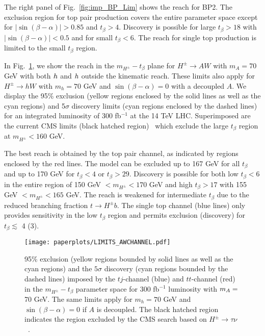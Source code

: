 The right panel of Fig.~\ref{fig:imp_BP_Lim} shows the reach for BP2. The exclusion region for top pair production covers the entire parameter space except for $|\sin(\beta-\alpha)| >0.85$ and $t_{\beta}> 4$. Discovery is possible for large $t_{\beta}>18$ with $|\sin(\beta-\alpha)|<0.5$ and for small $t_{\beta}<6$. The reach for single top production is limited to the small $t_{\beta}$ region.

In Fig.~\ref{fig:imp_Limits}, we show the reach in the $m_{H^{\pm}}-t_{\beta}$ plane for $H^{\pm} \rightarrow AW$ with $m_A=70$ GeV with both $h$ and $h$ outside the kinematic reach. These limits also apply for $H^{\pm} \rightarrow hW$ with $m_{h}=70$ GeV and $\sin(\beta-\alpha)=0$ with a decoupled $A$. We display the 95\% exclusion (yellow regions enclosed by the solid lines as well as the cyan regions) and 5$\sigma$ discovery limits (cyan regions enclosed by the dashed lines) for an integrated luminosity of 300 fb$^{-1}$ at the 14 TeV LHC. Superimposed are the current CMS limits (black hatched region)~\cite{CMS:2014cdp} which exclude the large $t_{\beta}$ region at $m_{H^\pm}<160$ GeV. 

The best reach is obtained by the top pair channel, as indicated by regions enclosed by the red lines. The model can be excluded up to 167 GeV for all $t_{\beta}$ and up to 170 GeV for $t_{\beta}<4$ or $t_{\beta}>29$. Discovery is possible for both low $t_{\beta}<$6 in the entire region of 150 GeV $< m_{H^\pm}<170$ GeV and high $t_{\beta} > 17$ with 155 GeV $< m_{H^\pm}<165$ GeV. The reach is weakened for intermediate $t_{\beta}$ due to the reduced branching fraction $t \rightarrow H^{\pm} b$. The single top channel (blue lines) only provides sensitivity in the low $t_{\beta}$ region and permits exclusion (discovery) for $t_{\beta} \lesssim$ 4 (3). 



 \begin{figure}[h!]
 \centering
 	\texttt{[image: paperplots/LIMITS\_AWCHANNEL.pdf]}
\caption{95\% exclusion (yellow regions bounded by solid lines as well as the cyan regions) and the $5\sigma$ discovery (cyan regions bounded by the dashed lines) imposed by the $tj$-channel (blue) and $tt$-channel (red) in the $m_{H^{\pm}}-t_{\beta}$ parameter space for 300 fb$^{-1}$ luminosity with $m_A=$ 70 GeV. The same limits apply for $m_{h}=70$ GeV and $\sin(\beta-\alpha)=0$ if $A$ is decoupled. The black hatched region indicates the region excluded by the CMS search based on $H^{\pm} \rightarrow \tau \nu$~\cite{CMS:2014cdp}. }
\label{fig:imp_Limits}
\end{figure}

